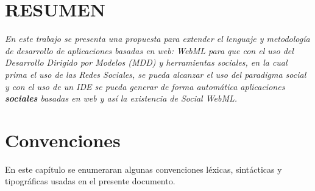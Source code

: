 \documentclass[oneside,12pt,a4paper]{memoir}%
\begin{document}
\renewcommand\contentsname{\'INDICE} 
\renewcommand\listfigurename{LISTA DE FIGURAS}
\renewcommand\listtablename{LISTA DE TABLAS}
\renewcommand{\tablename}{Tabla}
\renewcommand{\bibname}{BIBLIOGRAF\'IA}
\renewcommand{\appendixname}{Anexos}

\pagestyle{empty}

\frontmatter
\pagestyle{plain}
   
 


\chapter*{RESUMEN}
\label{chap:abstract}

\textit{En este trabajo se presenta una propuesta para extender el lenguaje y
metodolog\'ia de desarrollo de aplicaciones basadas en web: WebML para que
con el uso del Desarrollo Dirigido por Modelos (MDD) y herramientas sociales,
en la cual prima el uso de las Redes Sociales, se pueda alcanzar el uso del
paradigma social y con el uso de un IDE se pueda generar de forma
autom\'atica aplicaciones \textbf{sociales} basadas en web y as\'i la existencia
de Social WebML.}



\chapter*{Convenciones}
\label{chap:preface} 
En este cap\'itulo se enumeraran algunas convenciones l\'exicas, sint\'acticas y
tipogr\'aficas usadas en el presente documento.

\end{document}
